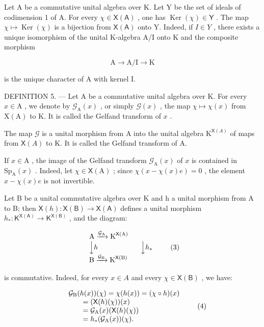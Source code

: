 Let A be a commutative unital algebra over K. Let Y be the set of ideals of codimension 1 of A. For every \(\chi \in \mathsf{X}(\mathsf{A})\) , one has \(\operatorname{Ker}(\chi) \in \mathsf{Y}\) . The map \(\chi \mapsto \operatorname{Ker}(\chi)\) is a bijection from \(\mathsf{X}(\mathsf{A})\) onto Y. Indeed, if \(I \in Y\) , there exists a unique isomorphism of the unital K-algebra A/I onto K and the composite morphism

\[
\mathrm{A} \longrightarrow \mathrm{A} / \mathrm{I} \longrightarrow \mathrm{K}
\]

is the unique character of A with kernel I.

DEFINITION 5. --- Let A be a commutative unital algebra over K. For every \(x \in \mathrm{A}\) , we denote by \(\mathcal{G}_{\mathrm{A}}(x)\) , or simply \(\mathcal{G}(x)\) , the map \(\chi \mapsto \chi(x)\) from \(\mathrm{X}(\mathrm{A})\) to K. It is called the Gelfand transform of \(x\) .

The map \(\mathcal{G}\) is a unital morphism from A into the unital algebra \(\mathrm{K}^{\mathsf{X}(A)}\) of maps from \(\mathsf{X}(A)\) to K. It is called the Gelfand transform of A.

If \(x \in \mathrm{A}\) , the image of the Gelfand transform \(\mathcal{G}_{\mathrm{A}}(x)\) of \(x\) is contained in \(\mathrm{Sp}_{\mathrm{A}}(x)\) . Indeed, let \(\chi \in \mathsf{X}(\mathrm{A})\) ; since \(\chi(x - \chi(x)e) = 0\) , the element \(x - \chi(x)e\) is not invertible.

Let B be a unital commutative algebra over K and h a unital morphism from A to B; then \(\mathsf{X}(h)\colon\mathsf{X}(\mathsf{B})\to\mathsf{X}(\mathsf{A})\) defines a unital morphism \(h_{*}\colon\mathsf{K}^{\mathsf{X}(\mathsf{A})}\to\mathsf{K}^{\mathsf{X}(\mathsf{B})}\) , and the diagram:

\[
\begin{array}{l} \text {A} \xrightarrow {\mathcal {G} _ {\text {A}}} \text {K} ^ {\mathsf {X} (\text {A})} \\ \Big \downarrow h \qquad \qquad \qquad \Big \downarrow h _ {*} \\ \text {B} \xrightarrow {\mathcal {G} _ {\text {B}}} \text {K} ^ {\mathsf {X} (\text {B})} \end{array}\tag{3}
\]

is commutative. Indeed, for every \(x \in A\) and every \(\chi \in \mathsf{X}(\mathsf{B})\) , we have:

\[
\begin{array}{r l} & {\mathcal {G} _ {\mathrm{B}} (h (x)) (\chi) = \chi (h (x)) = (\chi \circ h) (x)} \\ & {\qquad = (\mathsf {X} (h) (\chi)) (x)} \\ & {\qquad = \mathcal {G} _ {\mathrm{A}} (x) (\mathsf {X} (h) (\chi))} \\ & {\qquad = h _ {*} (\mathcal {G} _ {\mathrm{A}} (x)) (\chi).} \end{array}\tag{4}
\]

